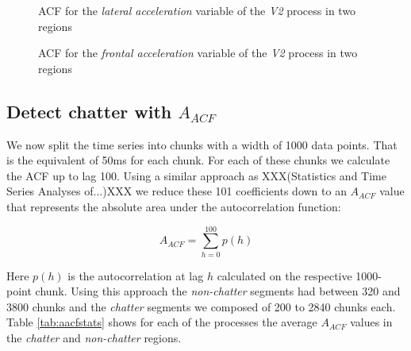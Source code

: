 \documentclass[12 pt]{scrartcl}
\begin{document}
\begin{figure}[p]
  \caption{ACF for the \emph{lateral acceleration} variable of the \emph{V2} process in two regions}
  \label{fig:v2-lateral-acfs}
\end{figure}


\begin{figure}[p]
  \caption{ACF for the \emph{frontal acceleration} variable of the \emph{V2} process in two regions}
  \label{fig:v2-frontal-acfs}
\end{figure}

\subsection{Detect chatter with $A_{ACF}$}

We now split the time series into chunks with a width of 1000 data points. That is the equivalent of 50ms for each chunk. For each of these chunks we calculate the ACF up to lag 100.
Using a similar approach as XXX(Statistics and Time Series Analyses of...)XXX we reduce these 101 coefficients down to an $A_{ACF}$ value that represents the absolute area under the autocorrelation function:

\[ A_{ACF} = \sum^{100}_{h=0}{p(h)}\]

Here $p(h)$ is the autocorrelation at lag $h$ calculated on the respective 1000-point chunk. Using this approach the \emph{non-chatter} segments had between 320 and 3800 chunks and the \emph{chatter} segments we composed of 200 to 2840 chunks each. Table \ref{tab:aacfstats} shows for each of the processes the average $A_{ACF}$ values in the \emph{chatter} and \emph{non-chatter} regions.
\end{document}
